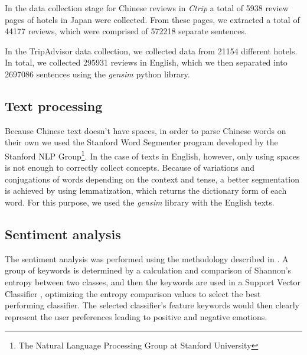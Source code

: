 \documentclass[review]{elsarticle}
\begin{document}
In the data collection stage for Chinese reviews in \textit{Ctrip} a total of \num[group-separator={,}]{5938} review pages of hotels in Japan were collected. From these pages, we extracted a total of \num[group-separator={,}]{44177} reviews, which were comprised of \num[group-separator={,}]{572218} separate sentences. 


In the TripAdvisor data collection, we collected data from \num[group-separator={,}]{21154} different hotels. In total, we collected \num[group-separator={,}]{295931} reviews in English, which we then separated into \num[group-separator={,}]{2697086} sentences using the \textit{gensim} python library. 

\subsection{Text processing}\label{textprocessing}

Because Chinese text doesn't have spaces, in order to parse Chinese words on their own we used the Stanford Word Segmenter \cite[][]{chang2008} program developed by the Stanford NLP Group\footnote{\label{stanfordnlp}The Natural Language Processing Group at Stanford University}. In the case of texts in English, however, only using spaces is not enough to correctly collect concepts. Because of variations and conjugations of words depending on the context and tense, a better segmentation is achieved by using lemmatization, which returns the dictionary form of each word. For this purpose, we used the \textit{gensim} library with the English texts.

\subsection{Sentiment analysis}\label{sentimentanalysis}

The sentiment analysis was performed using the methodology described in \cite{Aleman2018ICAROB}. A group of keywords is determined by a calculation and comparison of Shannon's entropy \cite[][]{shannon1948} between two classes, and then the keywords are used in a Support Vector Classifier \cite[][]{cortes1995}, optimizing the entropy comparison values to select the best performing classifier. The selected classifier's feature keywords would then clearly represent the user preferences leading to positive and negative emotions.
\end{document}
